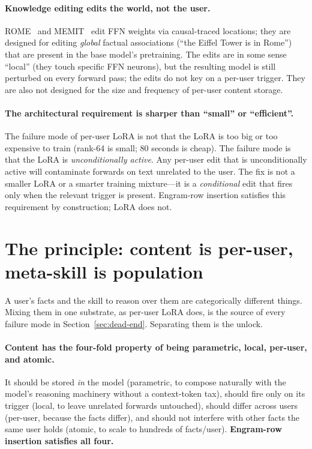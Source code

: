 \documentclass{article}
\begin{document}
\paragraph{Knowledge editing edits the world, not the user.}
ROME~\citep{meng2022rome} and MEMIT~\citep{meng2023memit} edit FFN
weights via causal-traced locations; they are designed for editing
\emph{global} factual associations (``the Eiffel Tower is in Rome'')
that are present in the base model's pretraining. The edits are in
some sense ``local'' (they touch specific FFN neurons), but the
resulting model is still perturbed on every forward pass; the edits
do not key on a per-user trigger. They are also not designed for the
size and frequency of per-user content storage.

\paragraph{The architectural requirement is sharper than ``small''
or ``efficient''.}
The failure mode of per-user LoRA is not that the LoRA is too big or
too expensive to train (rank-64 is small; 80 seconds is cheap). The
failure mode is that the LoRA is \emph{unconditionally active}. Any
per-user edit that is unconditionally active will contaminate
forwards on text unrelated to the user. The fix is not a smaller
LoRA or a smarter training mixture—it is a \emph{conditional} edit
that fires only when the relevant trigger is present. Engram-row
insertion satisfies this requirement by construction; LoRA does not.


\section{The principle: content is per-user, meta-skill is population}
\label{sec:principle}

A user's facts and the skill to reason over them are categorically
different things. Mixing them in one substrate, as per-user LoRA does,
is the source of every failure mode in Section~\ref{sec:dead-end}.
Separating them is the unlock.

\paragraph{Content has the four-fold property of being parametric,
local, per-user, and atomic.} It should be stored \emph{in} the model
(parametric, to compose naturally with the model's reasoning machinery
without a context-token tax), should fire only on its trigger (local,
to leave unrelated forwards untouched), should differ across users
(per-user, because the facts differ), and should not interfere with
other facts the same user holds (atomic, to scale to hundreds of
facts/user). \textbf{Engram-row insertion satisfies all four.}
\end{document}
